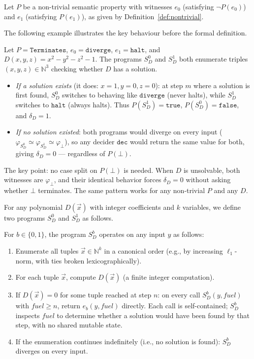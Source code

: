 \documentclass{lmcs}
\begin{document}
Let \(P\) be a non-trivial semantic property with witnesses \(e_0\) (satisfying
\(\neg P(e_0)\)) and \(e_1\) (satisfying \(P(e_1)\)), as given by
Definition~\ref{def:nontrivial}.

The following example illustrates the key behaviour before the formal definition.


\begin{exa}
\label{ex:concrete}
Let $P = \mathtt{Terminates}$, $e_0 = \mathtt{diverge}$,
$e_1 = \mathtt{halt}$, and $D(x,y,z) = x^2-y^2-z^2-1$.
The programs $S_D^0$ and $S_D^1$ both enumerate triples
$(x,y,z)\in\mathbb{N}^3$ checking whether $D$ has a solution.
\begin{itemize}
  \item \emph{If a solution exists} (it does: $x=1,y=0,z=0$):
        at step $m$ where a solution is first found,
        $S_D^0$ switches to behaving like $\mathtt{diverge}$ (never halts),
        while $S_D^1$ switches to $\mathtt{halt}$ (always halts).
        Thus $P(S_D^1)=\mathtt{true}$, $P(S_D^0)=\mathtt{false}$,
        and $\delta_D = 1$.
  \item \emph{If no solution existed}: both programs would diverge on every
        input ($\varphi_{S_D^0}\simeq\varphi_{S_D^1}\simeq\varphi_\bot$),
        so any decider $\mathtt{dec}$ would return the same value for both,
        giving $\delta_D = 0$ --- regardless of $P(\bot)$.
\end{itemize}
The key point: no case split on $P(\bot)$ is needed. When $D$ is unsolvable,
both witnesses are $\varphi_\bot$, and their identical behavior forces $\delta_D=0$
without asking whether $\bot$ terminates. The same pattern works for any
non-trivial $P$ and any $D$.
\end{exa}

For any polynomial \(D(\vec{x})\) with integer coefficients and \(k\) variables,
we define two programs \(S_D^0\) and \(S_D^1\) as follows.

\begin{defi}
\label{def:witness}
For \(b \in \{0, 1\}\), the program \(S_D^b\) operates on any input \(y\) as
follows:
\begin{enumerate}
  \item Enumerate all tuples \(\vec{x} \in \mathbb{N}^k\) in a canonical
        order (e.g., by increasing \(\ell_1\)-norm, with ties broken
        lexicographically).
  \item For each tuple \(\vec{x}\), compute \(D(\vec{x})\) (a finite integer
        computation).
  \item If \(D(\vec{x}) = 0\) for some tuple reached at step \(n\): on every
        call $S_D^b(y, \mathit{fuel})$ with $\mathit{fuel} \geq n$, return
        $e_b(y, \mathit{fuel})$ directly.  Each call is self-contained;
        $S_D^b$ inspects $\mathit{fuel}$ to determine whether a solution
        would have been found by that step, with no shared mutable state.
  \item If the enumeration continues indefinitely (i.e., no solution is found):
        \(S_D^b\) diverges on every input.
\end{enumerate}
\end{defi}
\end{document}
